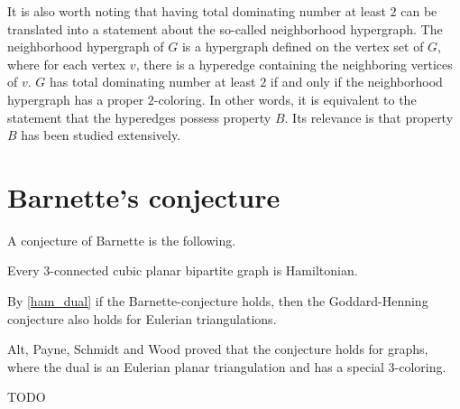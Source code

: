 It is also worth noting that having total dominating number at least $2$ can be
translated into a statement about the so-called neighborhood hypergraph. The neighborhood
hypergraph of $G$ is a hypergraph defined on the vertex set of $G$, where for each vertex
$v$, there is a hyperedge containing the neighboring vertices of $v$. $G$ has total
dominating number at least $2$ if and only if the neighborhood hypergraph has a
proper $2$-coloring. In other words,
it is equivalent to the statement that the hyperedges possess property $B$. Its relevance
is that property $B$ has been studied extensively.

\section{Barnette's conjecture}

A conjecture of Barnette \cite{barnette} is the following.
\begin{conj}
  Every $3$-connected cubic planar bipartite graph is Hamiltonian.
\end{conj}

By \ref{ham_dual} if the Barnette-conjecture holds, then the Goddard-Henning
conjecture also holds for Eulerian triangulations.

Alt, Payne, Schmidt and Wood \cite{spec_barnette} proved that the conjecture holds
for graphs, where the dual is an Eulerian planar triangulation and has a special $3$-coloring.

TODO
